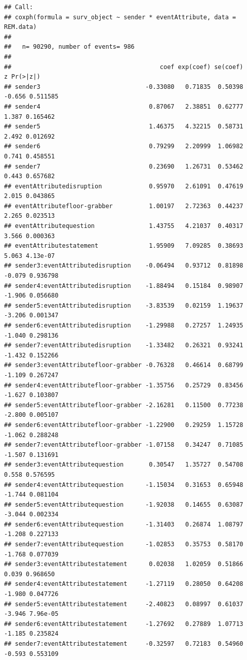 \documentclass[
]{article}
\begin{document}
\begin{verbatim}
## Call:
## coxph(formula = surv_object ~ sender * eventAttribute, data = REM.data)
## 
##   n= 90290, number of events= 986 
## 
##                                         coef exp(coef) se(coef)      z Pr(>|z|)
## sender3                             -0.33080   0.71835  0.50398 -0.656 0.511585
## sender4                              0.87067   2.38851  0.62777  1.387 0.165462
## sender5                              1.46375   4.32215  0.58731  2.492 0.012692
## sender6                              0.79299   2.20999  1.06982  0.741 0.458551
## sender7                              0.23690   1.26731  0.53462  0.443 0.657682
## eventAttributedisruption             0.95970   2.61091  0.47619  2.015 0.043865
## eventAttributefloor-grabber          1.00197   2.72363  0.44237  2.265 0.023513
## eventAttributequestion               1.43755   4.21037  0.40317  3.566 0.000363
## eventAttributestatement              1.95909   7.09285  0.38693  5.063 4.13e-07
## sender3:eventAttributedisruption    -0.06494   0.93712  0.81898 -0.079 0.936798
## sender4:eventAttributedisruption    -1.88494   0.15184  0.98907 -1.906 0.056680
## sender5:eventAttributedisruption    -3.83539   0.02159  1.19637 -3.206 0.001347
## sender6:eventAttributedisruption    -1.29988   0.27257  1.24935 -1.040 0.298136
## sender7:eventAttributedisruption    -1.33482   0.26321  0.93241 -1.432 0.152266
## sender3:eventAttributefloor-grabber -0.76328   0.46614  0.68799 -1.109 0.267247
## sender4:eventAttributefloor-grabber -1.35756   0.25729  0.83456 -1.627 0.103807
## sender5:eventAttributefloor-grabber -2.16281   0.11500  0.77238 -2.800 0.005107
## sender6:eventAttributefloor-grabber -1.22900   0.29259  1.15728 -1.062 0.288248
## sender7:eventAttributefloor-grabber -1.07158   0.34247  0.71085 -1.507 0.131691
## sender3:eventAttributequestion       0.30547   1.35727  0.54708  0.558 0.576595
## sender4:eventAttributequestion      -1.15034   0.31653  0.65948 -1.744 0.081104
## sender5:eventAttributequestion      -1.92038   0.14655  0.63087 -3.044 0.002334
## sender6:eventAttributequestion      -1.31403   0.26874  1.08797 -1.208 0.227133
## sender7:eventAttributequestion      -1.02853   0.35753  0.58170 -1.768 0.077039
## sender3:eventAttributestatement      0.02038   1.02059  0.51866  0.039 0.968650
## sender4:eventAttributestatement     -1.27119   0.28050  0.64208 -1.980 0.047726
## sender5:eventAttributestatement     -2.40823   0.08997  0.61037 -3.946 7.96e-05
## sender6:eventAttributestatement     -1.27692   0.27889  1.07713 -1.185 0.235824
## sender7:eventAttributestatement     -0.32597   0.72183  0.54960 -0.593 0.553109

\end{verbatim}
\end{document}

